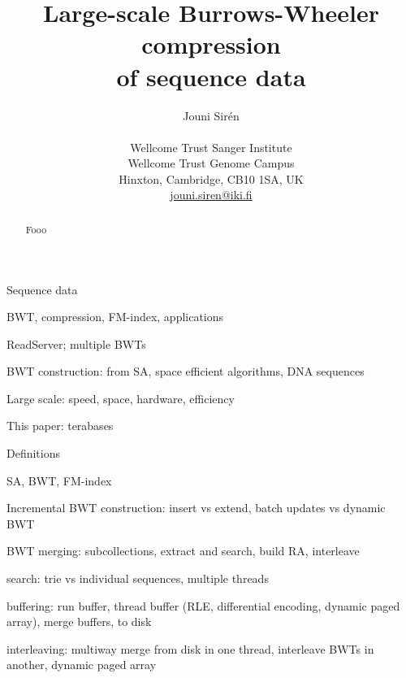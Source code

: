 \documentclass[smallabstract,smallcaptions]{dccpaper}
\begin{document}
\title
{\large
\textbf{Large-scale Burrows-Wheeler compression \\ of sequence data}
}


\author{%
Jouni Sirén \\[0.5em]
{\small\begin{minipage}{\linewidth}\begin{center}
\begin{tabular}{c}
Wellcome Trust Sanger Institute \\
Wellcome Trust Genome Campus \\
Hinxton, Cambridge, CB10 1SA, UK \\
\url{jouni.siren@iki.fi}
\end{tabular}
\end{center}\end{minipage}}
}


\maketitle
\thispagestyle{empty}


\begin{abstract}
Fooo
\end{abstract}



Sequence data

BWT, compression, FM-index, applications

ReadServer; multiple BWTs

BWT construction: from SA, space efficient algorithms, DNA sequences

Large scale: speed, space, hardware, efficiency

This paper: terabases



Definitions

SA, BWT, FM-index

Incremental BWT construction: insert vs extend, batch updates vs dynamic BWT

BWT merging: subcollections, extract and search, build RA, interleave



search: trie vs individual sequences, multiple threads

buffering: run buffer, thread buffer (RLE, differential encoding, dynamic paged array), merge buffers, to disk

interleaving: multiway merge from disk in one thread, interleave BWTs in another, dynamic paged array
\end{document}

